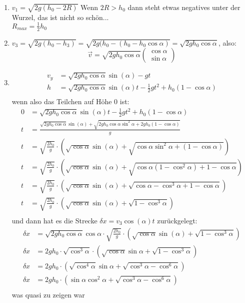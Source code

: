 \documentclass[sectionformat = aufgabe]{gadsescript}
\begin{document}
\begin{enumerate}[label=\alph*)]
	\item $ v_1 = \sqrt{2g(h_0 - 2R)} $ Wenn $ 2R > h_0 $ dann steht etwas negatives unter der Wurzel, das ist nicht so schön...\\
		$ R_{max} = \frac{1}{2} h_0 $
	\item $ v_3 = \sqrt{2g(h_0 - h_3)} = \sqrt{2g(h_0 - (h_0 - h_0 \cos \alpha)} = \sqrt{2gh_0 \cos \alpha} $, also:
		\[ \vec v = \sqrt{2gh_0\cos\alpha} \begin{pmatrix}
			\cos\alpha\\
			\sin\alpha
		\end{pmatrix}
		\]
	\item 
		\begin{align*}
			v_y &= \sqrt{2gh_0\cos\alpha} \sin(\alpha) -gt \\
			h &= \sqrt{2gh_0\cos\alpha} \sin(\alpha) t - \frac{1}{2} gt^2 + h_0(1 - \cos\alpha)\\
		\end{align*}
		wenn also das Teilchen auf Höhe 0 ist:
		\begin{align*}
			0 &= \sqrt{2gh_0\cos\alpha} \sin(\alpha) t - \frac{1}{2} gt^2 + h_0(1 - \cos\alpha)\\
			t &= \frac{\sqrt{2gh_0\cos\alpha}\sin(\alpha) + \sqrt{ 2gh_0\cos\alpha\sin^2\alpha + 2gh_0(1 - \cos\alpha)}}{g}\\
			t &= \sqrt{\frac{2h_0}{g}} \cdot \left( \sqrt{\cos\alpha}\sin(\alpha) + \sqrt{ \cos\alpha\sin^2\alpha + (1 - \cos\alpha)} \right)\\
			t &= \sqrt{\frac{2h_0}{g}} \cdot \left( \sqrt{\cos\alpha}\sin(\alpha) + \sqrt{ \cos\alpha(1- \cos^2\alpha) + 1 - \cos\alpha}\right)\\
			t &= \sqrt{\frac{2h_0}{g}} \cdot \left( \sqrt{\cos\alpha}\sin(\alpha) + \sqrt{ \cos\alpha - \cos^3\alpha + 1 - \cos\alpha} \right) \\
			t &= \sqrt{\frac{2h_0}{g}} \cdot \left( \sqrt{\cos\alpha}\sin(\alpha) + \sqrt{ 1 - \cos^3\alpha } \right)\\
		\end{align*}
		und dann hat es die Strecke $ \delta x = v_3 \cos(\alpha) t $ zurückgelegt:
		\begin{align*}
			\delta x &= \sqrt{2gh_0\cos\alpha} \cos\alpha \cdot \sqrt{\frac{2h_0}{g}} \cdot \left(\sqrt{\cos\alpha}\sin(\alpha) + \sqrt{ 1 - \cos^3\alpha } \right)\\
			\delta x &= 2gh_0 \cdot \sqrt{\cos^3\alpha} \cdot \left( \sqrt{\cos\alpha}\sin\alpha + \sqrt{ 1 - \cos^3\alpha } \right)\\
			\delta x &= 2gh_0 \cdot \left( \sqrt{\cos^4\alpha}\sin\alpha + \sqrt{ \cos^3\alpha - \cos^6\alpha } \right)\\
			\delta x &= 2gh_0 \cdot \left( \sin\alpha\cos^2\alpha + \sqrt{ \cos^3\alpha - \cos^6\alpha } \right)\\
		\end{align*}
		was quasi zu zeigen war
\end{enumerate}
\end{document}

